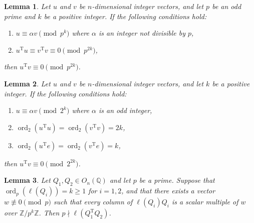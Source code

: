 \documentclass[10pt,a4paper]{amsart}
\newtheorem{lemma}{Lemma}
\newcommand{\trans}{^{\mathrm{T}}}
\begin{document}
\begin{lemma}
\label{lemma:uv}
Let $u$ and $v$ be $n$-dimensional integer vectors, and let $p$ be an odd prime and $k$ be a positive integer. If the following conditions hold:
\begin{enumerate}
\item $u \equiv \alpha v \pmod{p^k}$ where $\alpha$ is an integer not divisible by $p$,
\item $u\trans u \equiv v\trans v \equiv 0 \pmod{p^{2k}}$,
\end{enumerate}
then $u\trans v \equiv 0 \pmod{p^{2k}}$.
\end{lemma}

\begin{lemma}
\label{lemma:uv-2}
Let $u$ and $v$ be $n$-dimensional integer vectors, and let $k$ be a positive integer. If the following conditions hold:
\begin{enumerate}
\item $u \equiv \alpha v \pmod{2^k}$ where $\alpha$ is an odd integer,
\item $\operatorname{ord}_2(u\trans u) = \operatorname{ord}_2(v\trans v) = 2k$,
\item $\operatorname{ord}_2(u\trans e) = \operatorname{ord}_2(v\trans e) = k$,
\end{enumerate}
then $u\trans v \equiv 0 \pmod{2^{2k}}$.
\end{lemma}

\begin{lemma}
\label{lemma:p-out}
Let $Q_1, Q_2 \in O_n(\mathbb{Q})$ and let $p$ be a prime. Suppose that 
$\operatorname{ord}_p(\ell(Q_i)) = k \geq 1$ for $i=1,2$, and that there exists a vector $w \not\equiv 0 \pmod{p}$ such that every column 
of $\ell(Q_i)Q_i$ is a scalar multiple of $w$ 
over $\mathbb{Z}/p^k\mathbb{Z}$. Then $p \nmid \ell(Q_1\trans Q_2)$.
\end{lemma}
\end{document}
